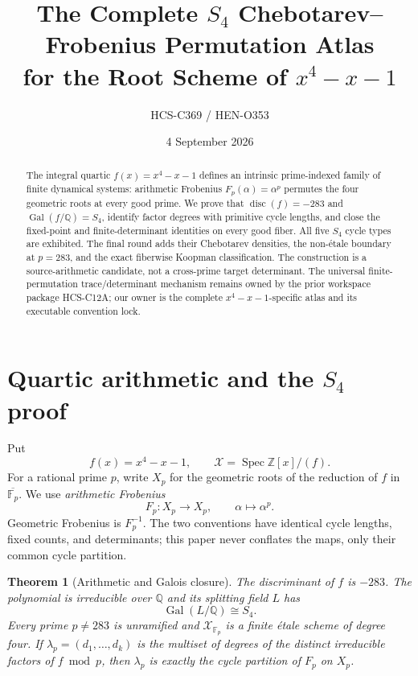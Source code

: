 \documentclass[10pt]{article}
\title{The Complete $S_4$ Chebotarev--Frobenius Permutation Atlas\\
for the Root Scheme of $x^4-x-1$}
\author{HCS-C369 / HEN-O353}
\date{4 September 2026}
\newtheorem{theorem}{Theorem}
\newcommand{\Fp}{\mathbb F_p}
\newcommand{\Gal}{\operatorname{Gal}}
\newcommand{\Spec}{\operatorname{Spec}}
\begin{document}
\maketitle

\begin{abstract}
The integral quartic $f(x)=x^4-x-1$ defines an intrinsic prime-indexed
family of finite dynamical systems: arithmetic Frobenius
$F_p(\alpha)=\alpha^p$ permutes the four geometric roots at every good
prime.  We prove that $\operatorname{disc}(f)=-283$ and
$\Gal(f/\mathbb Q)=S_4$, identify factor degrees with primitive cycle
lengths, and close the fixed-point and finite-determinant identities on
every good fiber.  All five $S_4$ cycle types are exhibited.  The final
round adds their Chebotarev densities, the non-\'etale boundary at $p=283$,
and the exact fiberwise Koopman classification.  The construction is a
source-arithmetic candidate, not a cross-prime target determinant.  The
universal finite-permutation trace/determinant mechanism remains owned by
the prior workspace package HCS-C12A; our owner is the complete
$x^4-x-1$-specific atlas and its executable convention lock.
\end{abstract}

\section{Quartic arithmetic and the $S_4$ proof}
Put
\begin{equation}\label{eq:f}
 f(x)=x^4-x-1,\qquad
 \mathcal X=\Spec\mathbb Z[x]/(f).
\end{equation}
For a rational prime $p$, write $X_p$ for the geometric roots of the
reduction of $f$ in $\overline{\Fp}$.  We use \emph{arithmetic Frobenius}
\begin{equation}\label{eq:frob}
 F_p:X_p\longrightarrow X_p,\qquad \alpha\longmapsto\alpha^p.
\end{equation}
Geometric Frobenius is $F_p^{-1}$.  The two conventions have identical
cycle lengths, fixed counts, and determinants; this paper never conflates
the maps, only their common cycle partition.

\begin{theorem}[Arithmetic and Galois closure]\label{thm:galois}
The discriminant of $f$ is $-283$.  The polynomial is irreducible over
$\mathbb Q$ and its splitting field $L$ has
\[
 \Gal(L/\mathbb Q)\cong S_4.
\]
Every prime $p\ne283$ is unramified and $\mathcal X_{\Fp}$ is a finite
\'etale scheme of degree four.  If
$\lambda_p=(d_1,\ldots,d_k)$ is the multiset of degrees of the distinct
irreducible factors of $f\bmod p$, then $\lambda_p$ is exactly the cycle
partition of $F_p$ on $X_p$.
\end{theorem}
\end{document}
